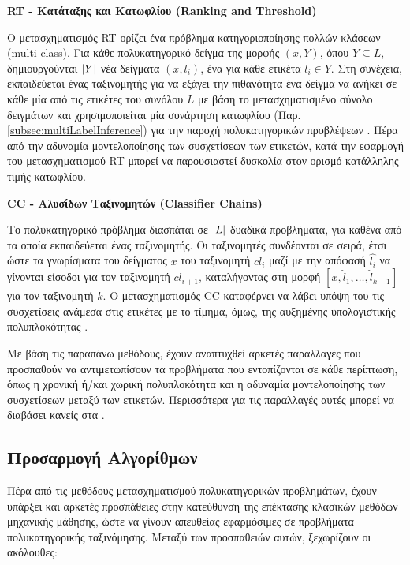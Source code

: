 \begin{description}
\item \textbf{RT - Κατάταξης και Κατωφλίου (Ranking and Threshold)}

Ο μετασχηματισμός RT ορίζει ένα πρόβλημα κατηγοριοποίησης πολλών κλάσεων (multi-class). Για κάθε πολυκατηγορικό δείγμα της μορφής $(x, Y)$, όπου $Y \subseteq L$, δημιουργούνται $\lvert Y\rvert$ νέα δείγματα $(x, l_{i})$, ένα για κάθε ετικέτα $l_{i} \in Y$. Στη συνέχεια, εκπαιδεύεται ένας ταξινομητής για να εξάγει την πιθανότητα ένα δείγμα να ανήκει σε κάθε μία από τις ετικέτες του συνόλου $L$ με βάση το μετασχηματισμένο σύνολο δειγμάτων και χρησιμοποιείται μία συνάρτηση κατωφλίου (Παρ. \ref{subsec:multiLabelInference}) για την παροχή πολυκατηγορικών προβλέψεων \cite{tsoumakas2007multi}. Πέρα από την αδυναμία μοντελοποίησης των συσχετίσεων των ετικετών, κατά την εφαρμογή του μετασχηματισμού RT μπορεί να παρουσιαστεί δυσκολία στον ορισμό κατάλληλης τιμής κατωφλίου.

\item \textbf{CC - Αλυσίδων Ταξινομητών (Classifier Chains)}

Το πολυκατηγορικό πρόβλημα διασπάται σε $\lvert L\rvert$ δυαδικά προβλήματα, για καθένα από τα οποία εκπαιδεύεται ένας ταξινομητής. Οι ταξινομητές συνδέονται σε σειρά, έτσι ώστε τα γνωρίσματα του δείγματος $x$ του ταξινομητή $cl_{i}$ μαζί με την απόφασή $\hat{l_{i}}$ να γίνονται είσοδοι για τον ταξινομητή $cl_{i+1}$, καταλήγοντας στη μορφή $[x, \hat{l}_{1}, \ldots, \hat{l}_{k - 1}]$ για τον ταξινομητή $k$. Ο μετασχηματισμός CC καταφέρνει να λάβει υπόψη του τις συσχετίσεις ανάμεσα στις ετικέτες με το τίμημα, όμως, της αυξημένης υπολογιστικής πολυπλοκότητας \cite{read2009classifier}.
\end{description}

Με βάση τις παραπάνω μεθόδους, έχουν αναπτυχθεί αρκετές παραλλαγές που προσπαθούν να αντιμετωπίσουν τα προβλήματα που εντοπίζονται σε κάθε περίπτωση, όπως η χρονική ή/και χωρική πολυπλοκότητα και η αδυναμία μοντελοποίησης των συσχετίσεων μεταξύ των ετικετών. Περισσότερα για τις παραλλαγές αυτές μπορεί να διαβάσει κανείς στα \cite{tsoumakas2007random, read2008multi}.

\subsection{Προσαρμογή Αλγορίθμων}
\label{subsec:algorithmAdjustment}

Πέρα από τις μεθόδους μετασχηματισμού πολυκατηγορικών προβλημάτων, έχουν υπάρξει και αρκετές προσπάθειες στην κατεύθυνση της επέκτασης κλασικών μεθόδων μηχανικής μάθησης, ώστε να γίνουν απευθείας εφαρμόσιμες σε προβλήματα πολυκατηγορικής ταξινόμησης. Μεταξύ των προσπαθειών αυτών, ξεχωρίζουν οι ακόλουθες:

